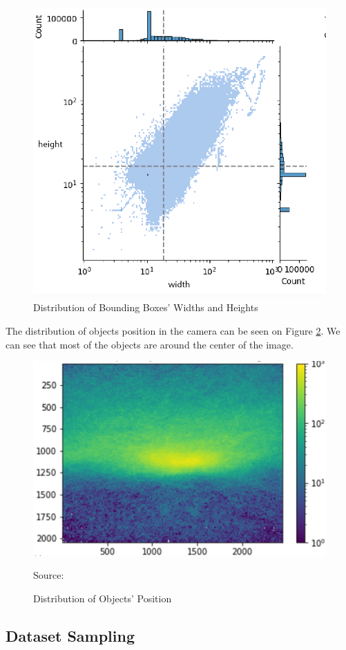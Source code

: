   \begin{figure}[H]
    \centering
    \includegraphics[width=.7\textwidth]{figures/hw-dist2.png}
    \caption{Distribution of Bounding Boxes' Widths and Heights}
    \label{fig:hwdist}
  \end{figure}

  The distribution of objects position in the camera can be seen on Figure \ref{fig:objectheatmap}.
  We can see that most of the objects are around the center of the image.

  \begin{figure}[H]
    \centering
    \includegraphics[width=.7\textwidth]{figures/object-pos-dist.png}
    \caption*{Source: \textcite{aot_dataset}}
    \caption{Distribution of Objects' Position}
    \label{fig:objectheatmap}
  \end{figure}




  \subsection{Dataset Sampling}
  \label{section:datasetsampling}
